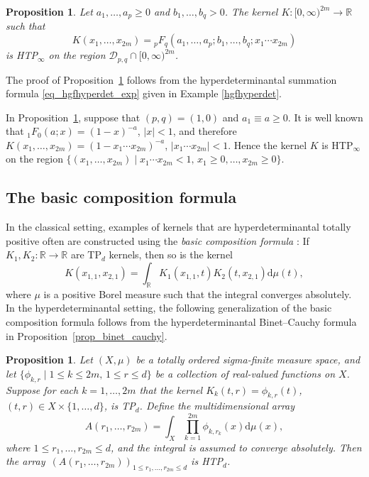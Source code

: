 \documentclass[pdftex]{sigma}
\numberwithin{equation}{section}
\newtheorem{Proposition}[Theorem]{Proposition}
 { \theoremstyle{definition}
\newtheorem{Definition}[Theorem]{Definition}
\newtheorem{Note}[Theorem]{Note}
\newtheorem{Example}[Theorem]{Example}
\newtheorem{Remark}[Theorem]{Remark} }
\def\R{{\mathbb R}}
\def\dd{ \mathrm{d}}
\def\mcalD{\mathcal{D}}
\begin{document}
\begin{Proposition}
\label{prop_hgfexample}
Let $a_1,\dots,a_p \ge 0$ and $b_1,\dots,b_q > 0$. The kernel $K\colon [0,\infty)^{2m} \to \R$ such that
\[
K(x_1,\dots,x_{2m}) = {}_pF_q(a_1,\dots,a_p;b_1,\dots,b_q;x_1\cdots x_{2m})
\]
is HTP$_\infty$ on the region $\mcalD_{p,q} \cap [0,\infty)^{2m}$.
\end{Proposition}

The proof of Proposition~\ref{prop_hgfexample} follows from the hyperdeterminantal summation formula \eqref{eq_hgfhyperdet_exp} given in Example \ref{hgfhyperdet}.

\begin{Example}
In Proposition~\ref{prop_hgfexample}, suppose that $(p,q)=(1,0)$ and $a_1 \equiv a \ge 0$. It is well known that ${}_1F_0(a;x) = (1-x)^{-a}$, $|x| < 1$, and therefore $K(x_1,\dots,x_{2m}) = (1 - x_1 \cdots x_{2m})^{-a}$, $|x_1\cdots x_{2m}| < 1$. Hence the kernel $K$ is HTP$_\infty$ on the region $\{(x_1,\dots,x_{2m})\mid x_1\cdots x_{2m} < 1,\, x_1 \ge 0,\dots,x_{2m} \ge 0\}$.
\end{Example}

\subsection{The basic composition formula}

In the classical setting, examples of kernels that are hyperdeterminantal totally positive often are constructed using the {\it basic composition formula} \cite{Karlin}: If $K_1, K_2 \colon \R \to \R$ are TP$_d$ kernels, then so is the kernel
\[
K(x_{1,1},x_{2,1}) = \int_\R K_1(x_{1,1},t) K_2(t,x_{2,1}) \dd\mu(t),
\]
where $\mu$ is a positive Borel measure such that the integral converges absolutely. In the hyperdeterminantal setting, the following generalization of the basic composition formula follows from the hyperdeterminantal Binet--Cauchy formula in Proposition~\ref{prop_binet_cauchy}.

\begin{Proposition}\label{prop_bcf}
Let $(X,\mu)$ be a totally ordered sigma-finite measure space, and let $\{\phi_{k,r}\mid 1 \le k \le 2m,\, 1 \le r \le d\}$ be a collection of real-valued functions on $X$. Suppose for each $k=1,\dots,2m$ that the kernel $K_k(t,r) = \phi_{k,r}(t)$, $(t,r) \in X \times \{1,\dots,d\}$, is TP$_d$. Define the multidimensional array
\[
A(r_1,\dots,r_{2m}) = \int_X \prod_{k=1}^{2m} \phi_{k,r_k}(x) \dd\mu(x),
\]
where $1 \le r_1,\dots,r_{2m} \le d$, and the integral is assumed to converge absolutely. Then the array~${(A(r_1,\dots,r_{2m}))_{1 \le r_1,\dots,r_{2m} \le d}}$ is HTP$_d$.
\end{Proposition}
\end{document}

